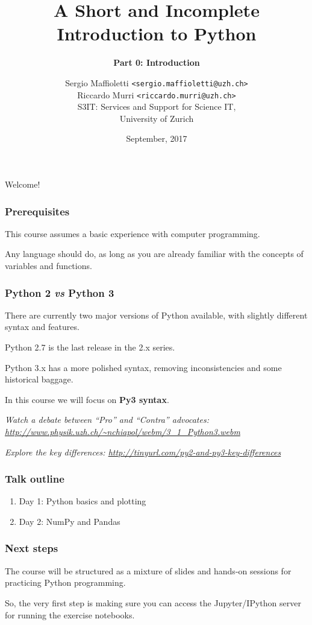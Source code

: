 \documentclass[english,serif,mathserif,xcolor=pdftex,dvipsnames,table]{beamer}
\title[Introduction to Python]{%
  A Short and Incomplete Introduction to Python
}
\subtitle{\bfseries Part 0: Introduction}
\author[R.~Murri]{%
  Sergio Maffioletti \texttt{<sergio.maffioletti@uzh.ch>}
  \\
  Riccardo Murri \texttt{<riccardo.murri@uzh.ch>}
  \\
  S3IT: Services and Support for Science IT,
  \\
  University of Zurich
}
\date{September, 2017}
\begin{document}
\maketitle

\begin{frame}
  \begin{center}
    {\Huge Welcome!}
  \end{center}
\end{frame}


\begin{frame}
  \frametitle{Prerequisites}
  This course assumes a basic experience with computer programming.

  \+
  Any language should do, as long as you are already familiar with
  the concepts of variables and functions.
\end{frame}


\begin{frame}[fragile]
  \frametitle{Python 2 \emph{vs} Python 3}

  There are currently two major versions of Python available, with
  slightly different syntax and features.

  \+
  Python 2.7 is the last release in the 2.x series.

  \+
  Python 3.x has a more polished syntax, removing inconsistencies and
  some historical baggage.

  \+
  In this course we will focus on \textbf{Py3 syntax}.

  \+
  {\footnotesize\em
    Watch a debate between ``Pro'' and ``Contra'' advocates:
    \url{http://www.physik.uzh.ch/~nchiapol/webm/3_1_Python3.webm}}

  \+
  {\footnotesize\em
    Explore the key differences:
    \url{http://tinyurl.com/py2-and-py3-key-differences}}
\end{frame}


\begin{frame}
  \frametitle{Talk outline}
  \begin{enumerate}
  \item Day 1: Python basics and plotting
  \item Day 2: NumPy and Pandas
  \end{enumerate}
\end{frame}


\begin{frame}
  \frametitle{Next steps}

  The course will be structured as a mixture of slides and hands-on
  sessions for practicing Python programming.

  \+
  So, the very first step is making sure you can access the Jupyter/IPython
  server for running the exercise notebooks.
\end{frame}
\end{document}
